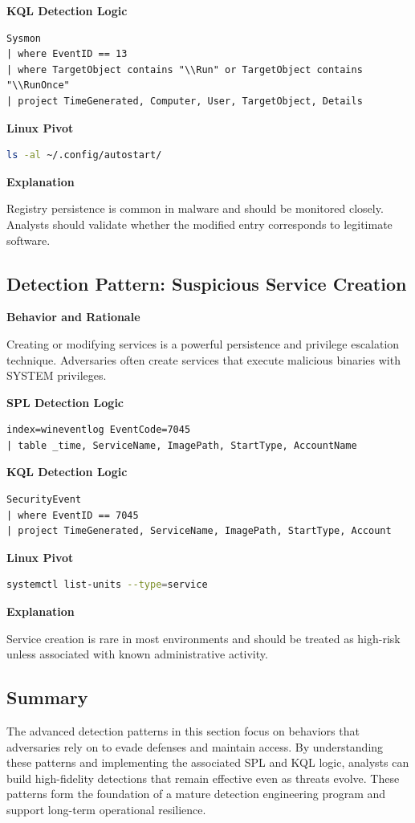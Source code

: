 \textbf{KQL Detection Logic}
\begin{lstlisting}
Sysmon
| where EventID == 13
| where TargetObject contains "\\Run" or TargetObject contains "\\RunOnce"
| project TimeGenerated, Computer, User, TargetObject, Details
\end{lstlisting}

\textbf{Linux Pivot}
\begin{lstlisting}[language=bash]
ls -al ~/.config/autostart/
\end{lstlisting}

\textbf{Explanation}

Registry persistence is common in malware and should be monitored closely. Analysts should validate whether the 
modified entry corresponds to legitimate software.

\subsection*{Detection Pattern: Suspicious Service Creation}

\textbf{Behavior and Rationale}

Creating or modifying services is a powerful persistence and privilege escalation technique. Adversaries often create 
services that execute malicious binaries with SYSTEM privileges.

\textbf{SPL Detection Logic}
\begin{lstlisting}
index=wineventlog EventCode=7045
| table _time, ServiceName, ImagePath, StartType, AccountName
\end{lstlisting}

\textbf{KQL Detection Logic}
\begin{lstlisting}
SecurityEvent
| where EventID == 7045
| project TimeGenerated, ServiceName, ImagePath, StartType, Account
\end{lstlisting}

\textbf{Linux Pivot}
\begin{lstlisting}[language=bash]
systemctl list-units --type=service
\end{lstlisting}

\textbf{Explanation}

Service creation is rare in most environments and should be treated as high-risk unless associated with known administrative activity.

\subsection*{Summary}

The advanced detection patterns in this section focus on behaviors that adversaries rely on to evade defenses and maintain access. 
By understanding these patterns and implementing the associated SPL and KQL logic, analysts can build high-fidelity detections 
that remain effective even as threats evolve. These patterns form the foundation of a mature detection engineering program and 
support long-term operational resilience.
